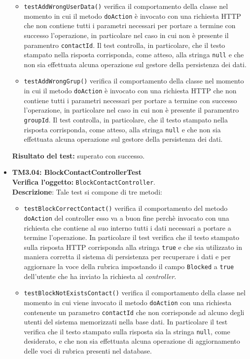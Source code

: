 \begin{itemize}
\begin{itemize}
\item \texttt{testAddWrongUserData()} verifica il comportamento della classe nel momento in cui il metodo \texttt{doAction} è invocato con una richiesta HTTP che non contiene tutti i parametri necessari per portare a termine con successo l'operazione, in particolare nel caso in cui non è presente il paramentro \texttt{contactId}. Il test controlla, in particolare, che il testo stampato nella risposta corrisponda, come atteso, alla stringa \texttt{null} e che non sia effettuata alcuna operazione sul gestore della persistenza dei dati.

\item \texttt{testAddWrongGrup()} verifica il comportamento della classe nel momento in cui il metodo \texttt{doAction} è invocato con una richiesta HTTP che non contiene tutti i parametri necessari per portare a termine con successo l'operazione, in particolare nel caso in cui non è presente il paramentro \texttt{groupId}. Il test controlla, in particolare, che il testo stampato nella risposta corrisponda, come atteso, alla stringa \texttt{null} e che non sia effettuata alcuna operazione sul gestore della persistenza dei dati.

\end{itemize}
\textbf{Risultato del test:} superato con successo.


\item \textbf{TM3.04: BlockContactControllerTest}\\
\textbf{Verifica l'oggetto:} \texttt{BlockContactController}.\\
\textbf{Descrizione}: %
Tale test si compone di tre metodi: 

\begin{itemize}
\item \texttt{testBlockCorrectContact()} verifica il comportamento del metodo \texttt{doAction} del controller esso va a buon fine perchè invocato con una richiesta che contiene al suo interno tutti i dati necessari a portare a termine l'operazione. In particolare il test verifica che il testo stampato sulla risposta HTTP corrisponda alla stringa \texttt{true} e che sia utilizzato in maniera corretta il sistema di persistenza per recuperare i dati e per aggiornare la voce della rubrica impostando il campo \texttt{Blocked} a \texttt{true} dell'utente che ha inviato la richiesta al \textit{controller}.

\item \texttt{testBlockNotExistsContact()} verifica il comportamento della classe nel momento in cui viene invocato il metodo \texttt{doAction} con una richiesta contenente un parametro \texttt{contactId} che non corrisponde ad alcuno degli utenti del sistema memorizzati nella base dati. In particolare il test verifica che il testo stampato sulla risposta sia la stringa \texttt{null}, come desiderato, e che non sia effettuata alcuna operazione di aggiornamento delle voci di rubrica presenti nel database.


\end{itemize}
\end{itemize}
